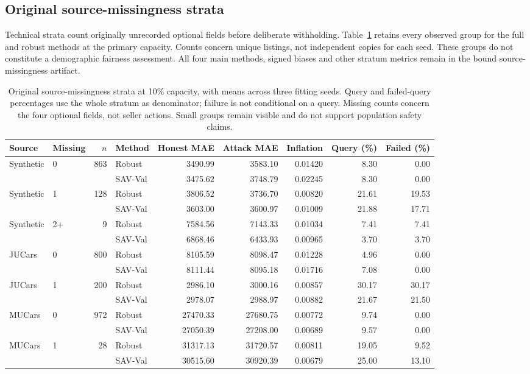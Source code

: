 \documentclass[10pt,journal]{IEEEtran}
\begin{document}
\subsection{Original source-missingness strata}
Technical strata count originally unrecorded optional fields before
deliberate withholding. Table~\ref{tab:technical_strata} retains every
observed group for the full and robust methods at the primary capacity.
Counts concern unique listings, not independent copies for each seed.
These groups do not constitute a demographic fairness assessment.
All four main methods, signed biases and other stratum metrics remain
in the bound source-missingness artifact.

\begin{table}[t]
\centering\small
\setlength{\tabcolsep}{4pt}
\caption{Original source-missingness strata at 10\% capacity, with means
across three fitting seeds. Query and failed-query percentages use the
whole stratum as denominator; failure is not conditional on a query.
Missing counts concern the four optional fields, not seller actions.
Small groups remain visible and do not support population safety claims.}
\label{tab:technical_strata}
\begin{tabular}{llrlrrrrr}
\toprule
Source & Missing & $n$ & Method & Honest MAE & Attack MAE & Inflation & Query (\%) & Failed (\%)\\
\midrule
Synthetic & 0 & 863 & Robust & 3490.99 & 3583.10 & 0.01420 & 8.30 & 0.00\\
 &  &  & SAV-Val & 3475.62 & 3748.79 & 0.02245 & 8.30 & 0.00\\
Synthetic & 1 & 128 & Robust & 3806.52 & 3736.70 & 0.00820 & 21.61 & 19.53\\
 &  &  & SAV-Val & 3603.00 & 3600.97 & 0.01009 & 21.88 & 17.71\\
Synthetic & 2+ & 9 & Robust & 7584.56 & 7143.33 & 0.01034 & 7.41 & 7.41\\
 &  &  & SAV-Val & 6868.46 & 6433.93 & 0.00965 & 3.70 & 3.70\\
\midrule
JUCars & 0 & 800 & Robust & 8105.59 & 8098.47 & 0.01228 & 4.96 & 0.00\\
 &  &  & SAV-Val & 8111.44 & 8095.18 & 0.01716 & 7.08 & 0.00\\
JUCars & 1 & 200 & Robust & 2986.10 & 3000.16 & 0.00857 & 30.17 & 30.17\\
 &  &  & SAV-Val & 2978.07 & 2988.97 & 0.00882 & 21.67 & 21.50\\
\midrule
MUCars & 0 & 972 & Robust & 27470.33 & 27680.75 & 0.00772 & 9.74 & 0.00\\
 &  &  & SAV-Val & 27050.39 & 27208.00 & 0.00689 & 9.57 & 0.00\\
MUCars & 1 & 28 & Robust & 31317.13 & 31720.57 & 0.00811 & 19.05 & 9.52\\
 &  &  & SAV-Val & 30515.60 & 30920.39 & 0.00679 & 25.00 & 13.10\\
\bottomrule
\end{tabular}
\end{table}
\end{document}
